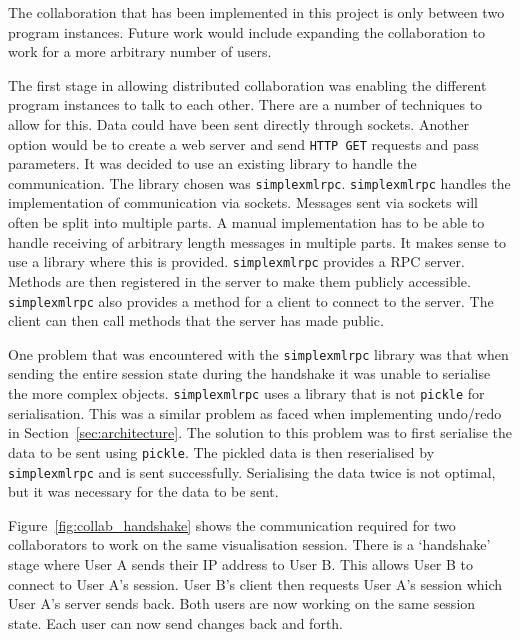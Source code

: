 The collaboration that has been implemented in this project is only between two program instances.  Future work would include expanding the collaboration to work for a more arbitrary number of users.

The first stage in allowing distributed collaboration was enabling the different program instances to talk to each other. There are a number of techniques to allow for this.  Data could have been sent directly through sockets. Another option would be to create a web server and send \texttt{HTTP GET} requests and pass parameters.  It was decided to use an existing library to handle the communication.  The library chosen was \texttt{simplexmlrpc}.  \texttt{simplexmlrpc} handles the implementation of communication via sockets.  Messages sent via sockets will often be split into multiple parts.  A manual implementation has to be able to handle receiving of arbitrary length messages in multiple parts.  It makes sense to use a library where this is provided.  \texttt{simplexmlrpc} provides a \ac{RPC} server.  Methods are then registered in the server to make them publicly accessible.  \texttt{simplexmlrpc} also provides a method for a client to connect to the server.  The client can then call methods that the server has made public.

One problem that was encountered with the \texttt{simplexmlrpc} library was that when sending the entire session state during the handshake it was unable to serialise the more complex objects.  \texttt{simplexmlrpc} uses a library that is not \texttt{pickle} for serialisation.  This was a similar problem as faced when implementing undo/redo in Section~\ref{sec:architecture}.  The solution to this problem was to first serialise the data to be sent using \texttt{pickle}.  The pickled data is then reserialised by \texttt{simplexmlrpc} and is sent successfully.  Serialising the data twice is not optimal, but it was necessary for the data to be sent.

Figure~\ref{fig:collab_handshake} shows the communication required for two collaborators to work on the same visualisation session.  There is a `handshake' stage where User A sends their IP address to User B.  This allows User B to connect to User A's session.  User B's client then requests User A's session which User A's server sends back.  Both users are now working on the same session state.  Each user can now send changes back and forth.

